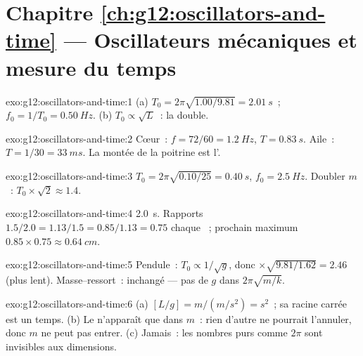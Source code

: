 \section*{Chapitre \ref{ch:g12:oscillators-and-time} --- Oscillateurs mécaniques et mesure du temps}

\begin{solution}{exo:g12:oscillators-and-time:1}
(a) $T_0 = 2\pi\sqrt{1.00/9.81} = \qty{2.01}{s}$~;
$f_0 = 1/T_0 = \qty{0.50}{Hz}$. (b) $T_0 \propto \sqrt{L}$~: la
 double.
\end{solution}

\begin{solution}{exo:g12:oscillators-and-time:2}
Cœur~: $f = 72/60 = \qty{1.2}{Hz}$, $T = \qty{0.83}{s}$. Aile~:
$T = 1/30 = \qty{33}{ms}$. La montée de la poitrine est
l'\emph{}.
\end{solution}

\begin{solution}{exo:g12:oscillators-and-time:3}
$T_0 = 2\pi\sqrt{0.10/25} = \qty{0.40}{s}$, $f_0 = \qty{2.5}{Hz}$.
Doubler $m$~: $T_0 \times \sqrt{2} \approx 1.4$.
\end{solution}

\begin{solution}{exo:g12:oscillators-and-time:4}
 \qty{2.0}{s}. Rapports $1.5/2.0 = 1.13/1.5 = 0.85/1.13
= 0.75$ chaque ~; prochain maximum $0.85 \times 0.75
\approx \qty{0.64}{cm}$.
\end{solution}

\begin{solution}{exo:g12:oscillators-and-time:5}
Pendule~: $T_0 \propto 1/\sqrt{g}$, donc $\times\sqrt{9.81/1.62} =
2.46$ (plus lent). Masse--ressort~: inchangé --- pas de $g$ dans
$2\pi\sqrt{m/k}$.
\end{solution}

\begin{solution}{exo:g12:oscillators-and-time:6}
(a) $[L/g] = \unit{m}/(\unit{m/s^2}) = \unit{s^2}$~; sa racine
carrée est un temps. (b) Le  n'apparaît que dans $m$~:
rien d'autre ne pourrait l'annuler, donc $m$ ne peut pas entrer.
(c) Jamais~: les nombres purs comme $2\pi$ sont invisibles aux
dimensions.
\end{solution}

